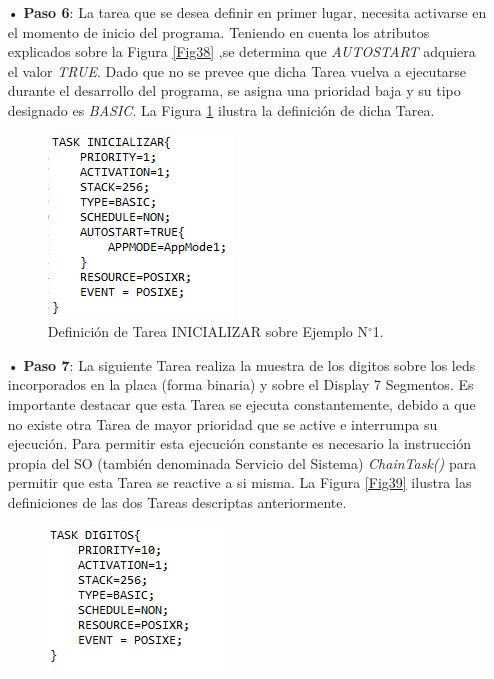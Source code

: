 \documentclass[12pt,letterpaper]{article}
\begin{document}
\begin{enumerate}
\item[•]\textbf{Paso 6}: La tarea que se desea definir en primer lugar, necesita activarse en el momento de inicio del programa. Teniendo en cuenta los atributos explicados sobre la Figura \ref{Fig38} ,se determina que \textit{AUTOSTART} adquiera el valor \textit{TRUE}. Dado que no se prevee que dicha Tarea vuelva a ejecutarse durante el desarrollo del programa, se asigna una prioridad baja y su tipo designado es \textit{BASIC}. La Figura \ref{inicializar} ilustra la definición de dicha Tarea.
\begin{figure}[H]
\centering
\includegraphics[width=4 cm]{figuras/f47.png}
\caption{Definición de Tarea INICIALIZAR sobre Ejemplo N$^{\circ}$1.}
\label{inicializar}
\end{figure}
\item[•]\textbf{Paso 7}: La siguiente Tarea realiza la muestra de los digitos sobre los leds incorporados en la placa (forma binaria) y sobre el Display 7 Segmentos. Es importante destacar que esta Tarea se ejecuta constantemente, debido a que no existe otra Tarea de mayor prioridad que se active e interrumpa su ejecución. Para permitir esta ejecución constante es necesario la instrucción propia del SO (también denominada Servicio del Sistema) \textit{ChainTask()} para permitir que esta Tarea se reactive a si misma. La Figura \ref{Fig39} ilustra las definiciones de las dos Tareas descriptas anteriormente.
\begin{figure}[H]
\centering
\includegraphics[width=8 cm]{figuras/f22.png}

\end{figure}
\end{enumerate}
\end{document}
